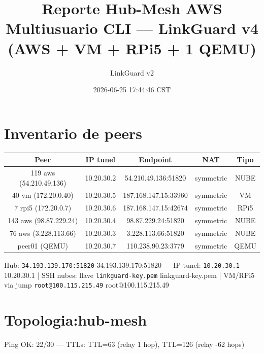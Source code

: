 \documentclass[11pt,a4paper]{article}
\title{Reporte Hub-Mesh AWS Multiusuario CLI — LinkGuard v4 (AWS + VM + RPi5 + 1 QEMU)}
\author{LinkGuard v2}
\date{2026-06-25 17:44:46 CST}
\begin{document}
\maketitle

\section{Inventario de peers}
\begin{longtable}{|c|c|c|c|c|}
\hline
Peer & IP tunel & Endpoint & NAT & Tipo \\ \hline
119 aws (54.210.49.136) & 10.20.30.2 & 54.210.49.136:51820 & symmetric & NUBE \\ \hline
40 vm (172.20.0.40) & 10.20.30.5 & 187.168.147.15:33960 & symmetric & VM \\ \hline
7 rpi5 (172.20.0.7) & 10.20.30.6 & 187.168.147.15:42674 & symmetric & RPi5 \\ \hline
143 aws (98.87.229.24) & 10.20.30.4 & 98.87.229.24:51820 & symmetric & NUBE \\ \hline
76 aws (3.228.113.66) & 10.20.30.3 & 3.228.113.66:51820 & symmetric & NUBE \\ \hline
peer01 (QEMU) & 10.20.30.7 & 110.238.90.23:3779 & symmetric & QEMU \\ \hline
\end{longtable}

Hub:  \texttt{34.193.139.170:51820} 34.193.139.170:51820  — IP tunel:  \texttt{10.20.30.1} 10.20.30.1  | SSH nubes: llave  \texttt{linkguard-key.pem} linkguard-key.pem  | VM/RPi5 via jump  \texttt{root@100.115.215.49} root@100.115.215.49\\

\section{Topologia:hub-mesh}
Ping OK: 22/30 — TTLs: TTL=63 (relay 1 hop), TTL=126 (relay -62 hops)\\
\end{document}
